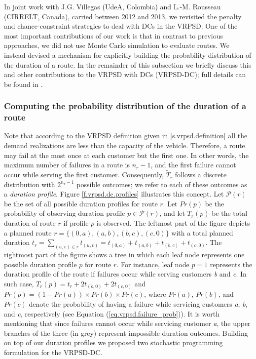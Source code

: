 In joint work with J.G. Villegas (UdeA, Colombia) and L.-M. Rousseau (CIRRELT, Canada), carried between 2012 and 2013, we revisited the penalty and chance-constraint strategies to deal with DCs in the VRPSD. One of the most important contributions of our work is that in contrast to previous approaches, we did not use Monte Carlo simulation to evaluate routes. We instead devised a mechanism for explicitly building the probability distribution of the duration of a route. In the remainder of this subsection we briefly discuss this and other contributions to the VRPSD with DCs (VRPSD-DC); full details can be found in \citep{Mendoza2015}.

\subsubsection{Computing the probability distribution of the duration of a route}
Note that according to the VRPSD definition given in \ref{s.vrpsd.definition} all the demand realizations are less than the capacity of the vehicle. Therefore, a route may fail at the most once at each customer but the first one. In other words, the maximum number of failures in a route is $n_{r}-1$, and the first failure cannot occur while serving the first customer. Consequently, $\tilde{T}_{r}$ follows a discrete distribution with $2^{n_r-1}$ possible outcomes; we refer to each of these outcomes as a \emph{duration profile}. Figure \ref{f.vrpsd.dc.profiles} illustrates this concept. Let $\mathcal{P}(r)$ be the set of all possible duration profiles for route $r$. Let $Pr(p)$ be the probability of observing duration profile $p\in\mathcal{P}(r)$, and let $T_{r}(p)$ be the total duration of route $r$ if profile $p$ is observed. The leftmost part of the figure depicts a planned route $r=\{(0,a),(a,b),(b,c),(c,0)\}$ with a total planned duration $t_{r}=\sum_{(u,v)\in r}t_{(u,v)}=t_{(0,a)}+t_{(a,b)}+t_{(b,c)}+t_{(c,0)}$. The rightmost part of the figure shows a tree in which each leaf node represents one possible duration profile $p$ for route $r$. For instance, leaf node $p=1$ represents the duration profile of the route if failures occur while serving customers \emph{b} and \emph{c}. In such case, $T_r(p)=t_r+2t_{(b,0)}+2t_{(c,0)}$ and $Pr(p)=\left(1-Pr(a)\right)\times Pr(b) \times Pr(c)$, where $Pr(a)$, $Pr(b)$, and $Pr(c)$ denote the probability of having a failure while servicing customers \emph{a}, \emph{b}, and \emph{c}, respectively (see Equation (\ref{eq.vrpsd.failure_prob})). It is worth mentioning that since failures cannot occur while servicing customer \emph{a}, the upper branches of the three (in grey) represent impossible duration outcomes. Building on top of our duration profiles we proposed two stochastic programming formulation for the VRPSD-DC.

